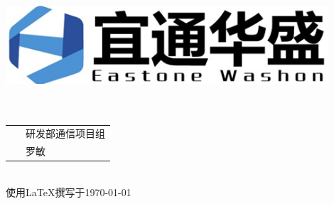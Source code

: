 \documentclass[a4paper,12pt]{report}
\begin{document}
\begin{titlepage}
	\begin{center}
		
    \includegraphics[width=0.9\textwidth]{figure//etws.png}\\
    \vspace{40mm}
    \textbf{}\\[0.8cm]
    \textbf{}\\[3cm]
    
	\vspace{\fill}
	
\setlength{\extrarowheight}{3mm}
{\songti{}	
\begin{tabular}{rl}
	
	{\makebox[4\ccwd][s]{部\qquad 门：}}& ~\kaishu 研发部通信项目组\\
	
	{\makebox[4\ccwd][s]{姓\qquad 名：}}& ~\kaishu 罗敏 \\ 

\end{tabular}
 }\\[2cm]
\vspace{\fill}
使用\LaTeX 撰写于\today
	\end{center}	
\end{titlepage}

\begin{abstract}
\begin{spacing}{1.5}
	{
	无人机集群是一个新的应用领域，特别是在军事领域,将会引发一场革命性的变革，而多机之间的通信又是无人机集群飞行之中的关键，如何实现
	更好的无几人集群之间的组网是一个需要深入研究和实验的方向。因应用领域的特殊性，真实环境采集数据测试具有很大的困难且花费大，因而需
	要预先实验仿真，本文档主要是仿真无人机集群使用olsr协议进行自组网通信,并评估olsr协议在组网过程中的各项性能指标和参数，为后续改进
	协议做参考。
	
	\textbf{关键字}：\quad 仿真 \quad 无人机集群 \quad olsr \quad 性能
	}
\end{spacing}
\end{abstract}
\end{document}
